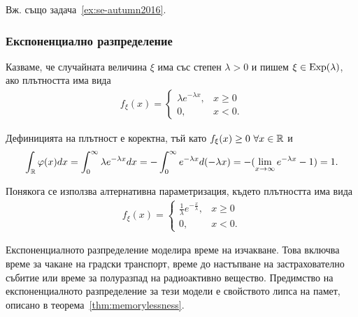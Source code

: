 \documentclass[numbers=endperiod, bibliography=totocnumbered]{scrartcl}
\begin{document}
Вж. също задача~\ref{ex:se-autumn2016}.

\subsubsection{Експоненциално разпределение}\label{dist:exp}

\begin{definition}
  Казваме, че случайната величина \( \xi \) има  със степен \( \lambda > 0 \) и пишем \( \xi \in \operatorname{Exp}(\lambda) \), ако плътността има вида
  \begin{align*}
    f_\xi(x) = \begin{cases}
      \lambda e^{-\lambda x}, & x \geq 0 \\
      0, &x < 0.
    \end{cases}
  \end{align*}

  Дефиницията на плътност е коректна, тъй като \( f_\xi(x) \geq 0~\forall x \in \mathbb{R} \) и
  \begin{align*}
    \int_{\mathbb{R}} \varphi(x) dx
    =
    \int_0^\infty \lambda e^{-\lambda x} dx
    =
    -\int_0^\infty e^{-\lambda x} d(-\lambda x)
    =
    -(\lim_{x \to \infty} e^{-\lambda x} - 1)
    =
    1.
  \end{align*}

  Понякога се използва алтернативна параметризация, където плътността има вида
  \begin{align*}
    f_\xi(x) = \begin{cases}
      \frac 1 \lambda e^{-\frac x \lambda}, & x \geq 0 \\
      0, &x < 0.
    \end{cases}
  \end{align*}
\end{definition}

Експоненциалното разпределение моделира време на изчакване. Това включва време за чакане на градски транспорт, време до настъпване на застрахователно събитие или време за полуразпад на радиоактивно вещество. Предимство на експоненциалното разпределение за тези модели е свойството липса на памет, описано в теорема~\ref{thm:memorylessness}.
\end{document}
